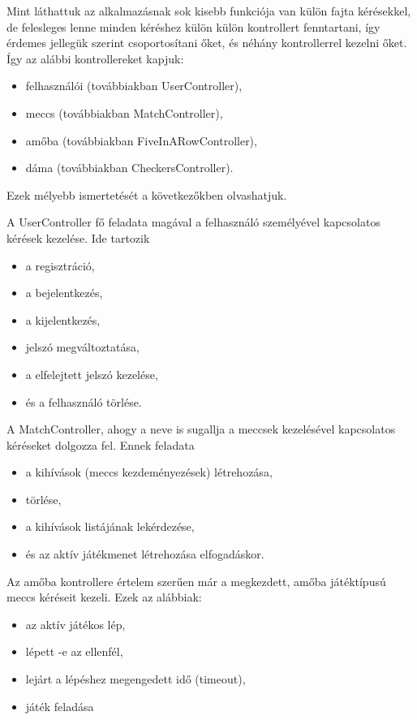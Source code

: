 Mint láthattuk az alkalmazásnak sok kisebb funkciója van külön fajta kérésekkel, de felesleges lenne minden kéréshez külön külön kontrollert fenntartani, így érdemes jellegük szerint csoportosítani őket, és néhány kontrollerrel kezelni őket. Így az alábbi kontrollereket kapjuk:
\begin{itemize}
	\item felhasználói (továbbiakban UserController),
	\item meccs (továbbiakban MatchController),
	\item amőba (továbbiakban FiveInARowController),
	\item dáma (továbbiakban CheckersController).
\end{itemize}
Ezek mélyebb ismertetését a következőkben olvashatjuk.

A UserController fő feladata magával a felhasználó személyével kapcsolatos kérések kezelése. Ide tartozik
\begin{itemize}
	\item a regisztráció,
	\item a bejelentkezés,
	\item a kijelentkezés,
	\item jelszó megváltoztatása,
	\item a elfelejtett jelszó kezelése,
	\item és a felhasználó törlése.
\end{itemize}

A MatchController, ahogy a neve is sugallja a meccsek kezelésével kapcsolatos kéréseket dolgozza fel. Ennek feladata
\begin{itemize}
	\item a kihívások (meccs kezdeményezések) létrehozása,
	\item törlése,
	\item a kihívások listájának lekérdezése,
	\item és az aktív játékmenet létrehozása elfogadáskor.
\end{itemize}

Az amőba kontrollere értelem szerűen már a megkezdett, amőba játéktípusú meccs kéréseit kezeli. Ezek az alábbiak:
\begin{itemize}
	\item az aktív játékos lép,
	\item lépett -e az ellenfél,
	\item lejárt a lépéshez megengedett idő (timeout),
	\item játék feladása
\end{itemize}

